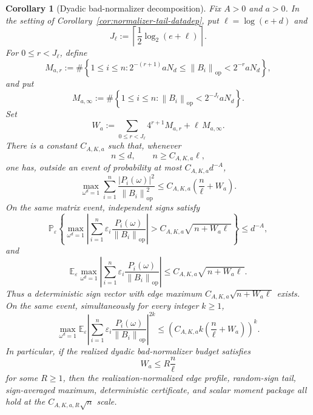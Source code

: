 \documentclass[11pt]{amsart}
\numberwithin{equation}{section}
\newtheorem{corollary}[theorem]{Corollary}
\theoremstyle{definition}
\theoremstyle{remark}
\newcommand{\op}{\mathrm{op}}
\newcommand{\Prob}{\mathbb P}
\newcommand{\Exp}{\mathbb E}
\newcommand{\norm}[1]{\left\lVert #1\right\rVert}
\newcommand{\abs}[1]{\left\lvert #1\right\rvert}
\newcommand{\eps}{\varepsilon}
\begin{document}
\begin{corollary}[Dyadic bad-normalizer decomposition]
\label{cor:normalizer-tail-dyadic}
Fix \(A>0\) and \(a>0\).  In the setting of
Corollary~\ref{cor:normalizer-tail-datadep}, put
\(\ell=\log(e+d)\) and
\[
  J_\ell:=\left\lceil \frac12\log_2(e+\ell)\right\rceil .
\]
For \(0\le r<J_\ell\), define
\[
  M_{a,r}:=
  \#\left\{1\le i\le n:
  2^{-(r+1)}aN_d\le \norm{B_i}_{\op}<2^{-r}aN_d\right\},
\]
and put
\[
  M_{a,\infty}:=
  \#\left\{1\le i\le n:
  \norm{B_i}_{\op}<2^{-J_\ell}aN_d\right\}.
\]
Set
\[
  W_a:=\sum_{0\le r<J_\ell}4^{r+1}M_{a,r}
       +\ell\,M_{a,\infty}.
\]
There is a constant \(C_{A,K,a}\) such that, whenever
\[
  n\le d,\qquad n\ge C_{A,K,a}\ell ,
\]
one has, outside an event of probability at most \(C_{A,K,a}d^{-A}\),
\[
  \max_{\omega^d=1}
  \sum_{i=1}^n
  \frac{\abs{P_i(\omega)}^2}{\norm{B_i}_{\op}^2}
  \le
  C_{A,K,a}\left(\frac n\ell+W_a\right).
\]
On the same matrix event, independent signs satisfy
\[
  \Prob_\eps\left\{
  \max_{\omega^d=1}\left|\sum_{i=1}^n
  \eps_i\frac{P_i(\omega)}{\norm{B_i}_{\op}}\right|
  >
  C_{A,K,a}\sqrt{\,n+W_a\ell\,}
  \right\}\le d^{-A},
\]
and
\[
  \Exp_\eps\max_{\omega^d=1}\left|\sum_{i=1}^n
  \eps_i\frac{P_i(\omega)}{\norm{B_i}_{\op}}\right|
  \le C_{A,K,a}\sqrt{\,n+W_a\ell\,}.
\]
Thus a deterministic sign vector with edge maximum
\(C_{A,K,a}\sqrt{n+W_a\ell}\) exists.  On the same event, simultaneously for
every integer \(k\ge1\),
\[
  \max_{\omega^d=1}
  \Exp_\eps\left|\sum_{i=1}^n
  \eps_i\frac{P_i(\omega)}{\norm{B_i}_{\op}}\right|^{2k}
  \le
  \left(C_{A,K,a}k\left(\frac n\ell+W_a\right)\right)^k .
\]
In particular, if the realized dyadic bad-normalizer budget satisfies
\[
  W_a\le R\frac n\ell
\]
for some \(R\ge1\), then the realization-normalized edge profile, random-sign
tail, sign-averaged maximum, deterministic certificate, and scalar moment
package all hold at the \(C_{A,K,a,R}\sqrt n\) scale.
\end{corollary}
\end{document}
